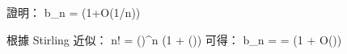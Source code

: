 \startigBase[continue]\startitem
證明：
\startformula
b_n = (1+O(1/n))
\stopformula
\stopitem\stopigBase

\startANSWER
根據 Stirling 近似：
\startformula
n! = 
     \left(\right)^n
     \left(1 + \Theta\left(\right)\right)
\stopformula
可得：
\startformula
b_n = 
    = 
      \left(1 + O\left(\right)\right)
\stopformula
\stopANSWER

\stopPROBLEM
